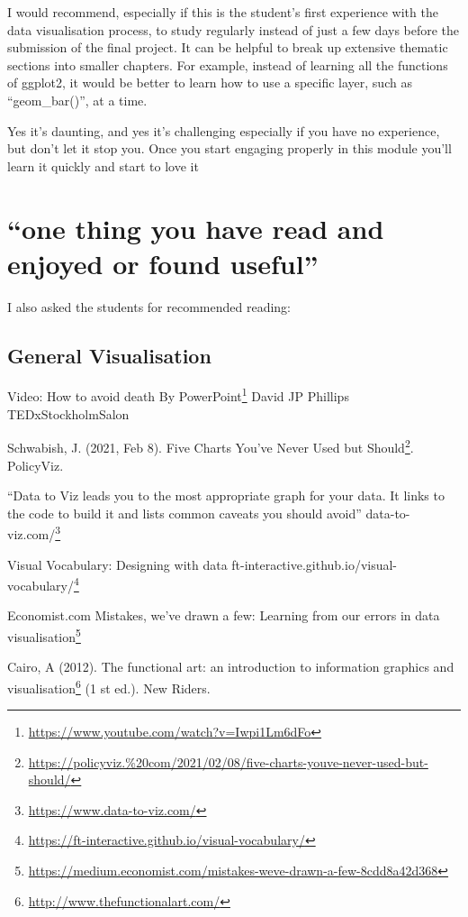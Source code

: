 \documentclass[
  12pt,
  a5paper,
]{book}
\DeclareRobustCommand{\href}[2]{#2\footnote{\url{#1}}}
\begin{document}
I would recommend, especially if this is the student's first experience with the data visualisation process, to study regularly instead of just a few days before the submission of the final project. It can be helpful to break up extensive thematic sections into smaller chapters. For example, instead of learning all the functions of ggplot2, it would be better to learn how to use a specific layer, such as ``geom\_bar()'', at a time.

Yes it's daunting, and yes it's challenging especially if you have no experience, but don't let it stop you. Once you start engaging properly in this module you'll learn it quickly and start to love it

\hypertarget{one-thing-you-have-read-and-enjoyed-or-found-useful}{%
\section{``one thing you have read and enjoyed or found useful''}\label{one-thing-you-have-read-and-enjoyed-or-found-useful}}

I also asked the students for recommended reading:

\hypertarget{general-visualisation}{%
\subsection{General Visualisation}\label{general-visualisation}}

Video: \href{https://www.youtube.com/watch?v=Iwpi1Lm6dFo}{How to avoid death By PowerPoint} \textbar{} David JP Phillips \textbar{} TEDxStockholmSalon

Schwabish, J. (2021, Feb 8). \href{https://policyviz.\%20com/2021/02/08/five-charts-youve-never-used-but-should/}{Five Charts You've Never Used but Should}. PolicyViz.

``Data to Viz leads you to the most appropriate graph for your data. It links to the code to build it and lists common caveats you should avoid'' \href{https://www.data-to-viz.com/}{data-to-viz.com/}

Visual Vocabulary: Designing with data \href{https://ft-interactive.github.io/visual-vocabulary/}{ft-interactive.github.io/visual-vocabulary/}

Economist.com \href{https://medium.economist.com/mistakes-weve-drawn-a-few-8cdd8a42d368}{Mistakes, we've drawn a few: Learning from our errors in data visualisation}

Cairo, A (2012). \href{http://www.thefunctionalart.com/}{The functional art: an introduction to information graphics and visualisation} (1 st ed.). New Riders.
\end{document}
